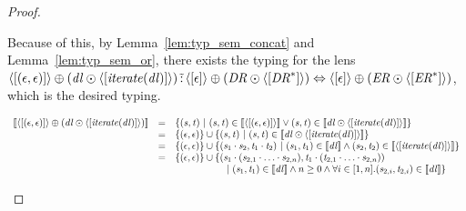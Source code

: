 \documentclass[numbers,10pt,preprint\ifanon ,nocopyrightspace\fi]{sigplanconf}
\begin{document}
\begin{proof}
\begin{case}[\AtomUnrollstarLeftRule{}]
    Because of this, by Lemma~\ref{lem:typ_sem_concat} and
    Lemma~\ref{lem:typ_sem_or}, there exists the typing
    for the lens
    $\langle[(\epsilon,\epsilon)]\rangle \oplus
    (\mathit{dl} \odot \langle[\mathit{\mathit{iterate}(\mathit{dl})}]\rangle)
    \,\tilde{:}\,
    \langle[\epsilon]\rangle \oplus (\mathit{DR} \odot
    \langle[{\mathit{DR}}^*]\rangle) \Leftrightarrow
    \langle[\epsilon]\rangle \oplus (\mathit{ER} \odot
    \langle[{\mathit{ER}}^*]\rangle)$, which is the desired typing.

    \[
      \begin{array}{rcl}
        \SemanticsOf{\DNFLensOf{\SequenceLensOf{(\EmptyString,\EmptyString)}}
        \OrDNFLens
        (\DNFLens \ConcatDNFLens
        \DNFLensOf{\SequenceLensOf{\IterateLensOf{\DNFLens}}})}
        & = & \SetOf{(\String,\StringAlt)\SuchThat
              (\String,\StringAlt)\in\SemanticsOf{\DNFLensOf{\SequenceLensOf{
              (\EmptyString,\EmptyString)}}} \BooleanOr (\String,\StringAlt)
              \in \SemanticsOf{\DNFLens \ConcatDNFLens
              \DNFLensOf{\SequenceLensOf{\IterateLensOf{\DNFLens}}}}}\\
        & = & \SetOf{(\EmptyString,\EmptyString)} \Union
              \SetOf{(\String,\StringAlt) \SuchThat (\String,\StringAlt) \in
              \SemanticsOf{\DNFLens \ConcatDNFLens
              \DNFLensOf{\SequenceLensOf{\IterateLensOf{\DNFLens}}}}}\\
        & = & \SetOf{(\EmptyString,\EmptyString)} \Union
              \SetOf{(\String_1\Concat\String_2,\StringAlt_1\Concat\StringAlt_2)
              \SuchThat (\String_1,\StringAlt_1) \in
              \SemanticsOf{\DNFLens} \BooleanAnd
              (\String_2,\StringAlt_2) \in
              \SemanticsOf{\DNFLensOf{\SequenceLensOf{\IterateLensOf{\DNFLens}}}}}\\
        & = & \SetOf{(\EmptyString,\EmptyString)} \Union
              \SetOf{(\String_1\Concat
              (\String_{2,1}\Concat\ldots\Concat\String_{2,n}),
              \StringAlt_1\Concat
              (\StringAlt_{2,1}\Concat\ldots\Concat\String_{2,n}))\\
        & & \hspace*{5em}
            \SuchThat (\String_1,\StringAlt_1) \in
            \SemanticsOf{\DNFLens} \BooleanAnd n\geq 0 \BooleanAnd
            \forall i\in\RangeIncInc{1}{n}.(\String_{2,i},\StringAlt_{2,i}) \in
            \SemanticsOf{\DNFLens}}\\

\end{array}\]
\end{case}
\end{proof}
\end{document}
